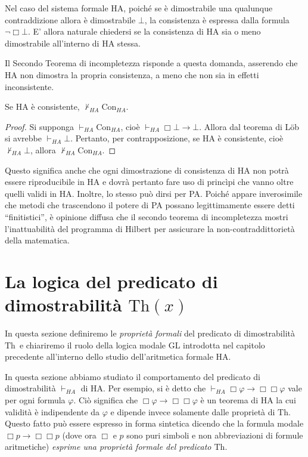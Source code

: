 Nel caso del sistema formale HA, poiché se è dimostrabile una qualunque contraddizione allora è dimostrabile $\bot$, la consistenza è espressa dalla formula $\neg\Box\bot$. E' allora naturale chiedersi se la consistenza di HA sia o meno dimostrabile all'interno di HA stessa.

Il Secondo Teorema di incompletezza risponde a questa domanda, asserendo che HA non dimostra la propria consistenza, a meno che non sia in effetti inconsistente.

\begin{thm}
Se HA è consistente, $\not\vdash_{HA}\mathrm{Con}_{HA}$.
\end{thm}

\begin{proof} Si supponga $\vdash_{HA}\mathrm{Con}_{HA}$, cioè $\vdash_{HA}\Box\bot\to\bot$. Allora dal teorema di L\"ob si avrebbe $\vdash_{HA}\bot$. Pertanto, per contrapposizione, se HA è consistente, cioè $\not\vdash_{HA}\bot$, allora $\not\vdash_{HA}\mathrm{Con}_{HA}$.
\end{proof}

\noindent Questo significa anche che ogni dimostrazione di consistenza di HA non potrà essere riproducibile in HA e dovrà pertanto fare uso di princìpi che vanno oltre quelli validi in HA. Inoltre, lo stesso può dirsi per PA. Poiché appare inverosimile che metodi che trascendono il potere di PA possano legittimamente essere detti ``finitistici'', è opinione diffusa che il secondo teorema di incompletezza mostri l'inattuabilità del programma di Hilbert per assicurare la non-contraddittorietà della matematica.

\section{La logica del predicato di dimostrabilità $\ensuremath{\mathrm{Th}}(x)$}

\noindent In questa sezione definiremo le \emph{proprietà formali} del predicato di dimostrabilità \ensuremath{\mathrm{Th}}\ e chiariremo il ruolo della logica modale GL introdotta nel capitolo precedente all'interno dello studio dell'aritmetica formale HA.

In questa sezione abbiamo studiato il comportamento del predicato di dimostrabilità $\vdash_{HA}$ di HA. Per esempio, si è detto che $\vdash_{HA}\Box\varphi\to\Box\Box\varphi$ vale per ogni formula $\varphi$. Ciò significa che $\Box\varphi\to\Box\Box\varphi$ è un teorema di HA la cui validità è indipendente da $\varphi$ e dipende invece solamente dalle proprietà di \ensuremath{\mathrm{Th}}. Questo fatto può essere espresso in forma sintetica dicendo che la formula modale $\Box p\to\Box\Box p$ (dove ora $\Box$ e $p$ sono puri simboli e non abbreviazioni di formule aritmetiche) \emph{esprime una proprietà formale del predicato \ensuremath{\mathrm{Th}}}.

